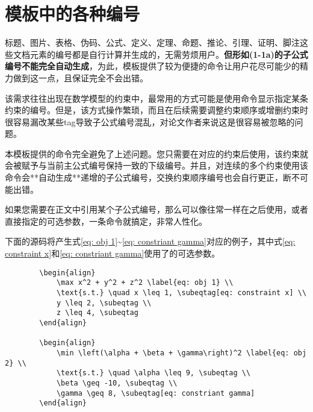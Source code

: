 \documentclass[print, doctor, vlined]{DissertUESTC}
\begin{document}
	
	\section{模板中的各种编号}
	
	标题、图片、表格、伪码、公式、定义、定理、命题、推论、引理、证明、脚注这些文档元素的编号都是自行计算并生成的，无需劳烦用户。\textbf{但形如(1-1a)的子公式编号不能完全自动生成}，为此，模板提供了较为便捷的命令让用户花尽可能少的精力做到这一点，且保证完全不会出错。
	
	该需求往往出现在数学模型的约束中，最常用的方式可能是使用命令显示指定某条约束的编号。但是，该方式操作繁琐，而且在后续需要调整约束顺序或增删约束时很容易漏改某些tag导致子公式编号混乱，对论文作者来说这是很容易被忽略的问题。
	
	本模板提供的命令完全避免了上述问题。您只需要在对应的约束后使用，该约束就会被赋予与当前主公式编号保持一致的下级编号。并且，对连续的多个约束使用该命令会**自动生成**递增的子公式编号，交换约束顺序编号也会自行更正，断不可能出错。
	
	如果您需要在正文中引用某个子公式编号，那么可以像往常一样在之后使用，或者直接指定的可选参数，一条命令就搞定，非常人性化。
	
	下面的源码将产生式\eqref{eq: obj 1}\textasciitilde \eqref{eq: constriant gamma}对应的例子，其中式\eqref{eq: constraint x}和\eqref{eq: constriant gamma}使用了的可选参数。
	
	
	\begin{verbatim}
		\begin{align}
			\max x^2 + y^2 + z^2 \label{eq: obj 1} \\
			\text{s.t.} \quad x \leq 1, \subeqtag[eq: constraint x] \\
			y \leq 2, \subeqtag \\
			z \leq 4, \subeqtag
		\end{align}
		
		\begin{align}
			\min \left(\alpha + \beta + \gamma\right)^2 \label{eq: obj 2} \\
			\text{s.t.} \quad \alpha \leq 9, \subeqtag \\
			\beta \geq -10, \subeqtag \\
			\gamma \geq 8, \subeqtag[eq: constriant gamma]
		\end{align}
	\end{verbatim}
	
\end{document}
